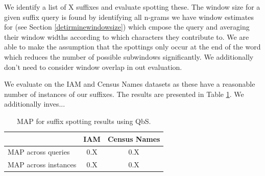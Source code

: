\documentclass[ms,electronic,twosidetoc,letterpaper,chaptercenter,parttop,lol,lof,lot]{byumsphd}
\begin{document}
We identify a list of X suffixes and evaluate spotting these. 
 The window size for a given suffix query is found by identifying all n-grams we have window estimates for (see Section \ref{detirminewindowsize}) which cmpose the query and averaging their window widths according to which characters they contribute to.
We are able to make the assumption that the spottings only occur at the end of the word which reduces the number of possible subwindows significantly. We additionally don't need to consider window overlap in out evaluation.

We evaluate on the IAM and Census Names datasets as these have a reasonable number of instances of our suffixes. The results are presented in Table \ref{tab:suffixspottingresults}. We additionally inves...



\begin{table}
\centering
\begin{tabular}{| l | c  c |}
  \hline
   & IAM & Census Names\\
  \hline			
  MAP across queries & 0.X  & 0.X \\
  MAP across instances & 0.X & 0.X \\
  \hline  
\end{tabular}
\caption{MAP for suffix spotting results using QbS.}
\label{tab:suffixspottingresults}
\end{table}
\end{document}
